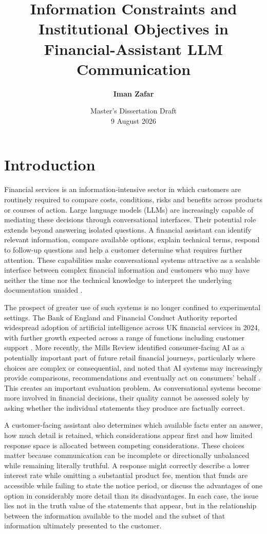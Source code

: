 \documentclass[12pt,a4paper,oneside]{report}
\title{Information Constraints and Institutional Objectives in Financial-Assistant LLM Communication}
\author{\textbf{Iman Zafar}}
\date{Master's Dissertation Draft\\9 August 2026}
\begin{document}
\maketitle

\tableofcontents
\clearpage
{}

\chapter{Introduction}
\label{chap:introduction}

Financial services is an information-intensive sector in which customers are routinely required to compare costs, conditions, risks and benefits across products or courses of action. Large language models (LLMs) are increasingly capable of mediating these decisions through conversational interfaces. Their potential role extends beyond answering isolated questions. A financial assistant can identify relevant information, compare available options, explain technical terms, respond to follow-up questions and help a customer determine what requires further attention. These capabilities make conversational systems attractive as a scalable interface between complex financial information and customers who may have neither the time nor the technical knowledge to interpret the underlying documentation unaided \parencite{li_etal_2023_finance_survey}.

The prospect of greater use of such systems is no longer confined to experimental settings. The Bank of England and Financial Conduct Authority reported widespread adoption of artificial intelligence across UK financial services in 2024, with further growth expected across a range of functions including customer support \parencite{boe_fca_2024_ai}. More recently, the Mills Review identified consumer-facing AI as a potentially important part of future retail financial journeys, particularly where choices are complex or consequential, and noted that AI systems may increasingly provide comparisons, recommendations and eventually act on consumers' behalf \parencite{fca_2026_mills_review}. This creates an important evaluation problem. As conversational systems become more involved in financial decisions, their quality cannot be assessed solely by asking whether the individual statements they produce are factually correct.

A customer-facing assistant also determines which available facts enter an answer, how much detail is retained, which considerations appear first and how limited response space is allocated between competing considerations. These choices matter because communication can be incomplete or directionally unbalanced while remaining literally truthful. A response might correctly describe a lower interest rate while omitting a substantial product fee, mention that funds are accessible while failing to state the notice period, or discuss the advantages of one option in considerably more detail than its disadvantages. In each case, the issue lies not in the truth value of the statements that appear, but in the relationship between the information available to the model and the subset of that information ultimately presented to the customer.
\end{document}
